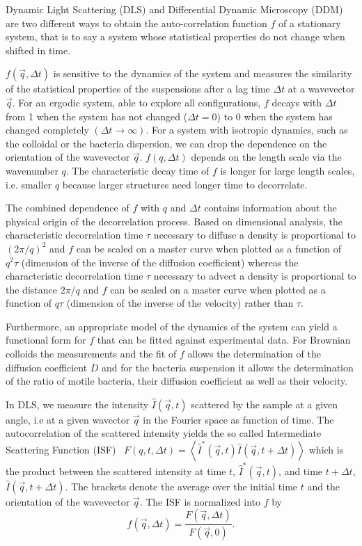 \documentclass[prb,reprint,amsmath,amssymb]{revtex4-1}
\newcommand{\tg}[1]{{\color{magenta}#1}} %
\begin{document}
Dynamic Light Scattering (DLS) and Differential Dynamic Microscopy (DDM) are two different ways to obtain the auto-correlation function \tg{$f$}\cite{ajp1995passmore} of a stationary system, that is to say a system whose statistical properties do not change when shifted in time. \tg{$f(\vec{q}, \Delta t)$ is sensitive to the dynamics of the system and measures the similarity of the statistical properties of the suspensions after a lag time $\Delta t$ at a wavevector $\vec{q}$. For an ergodic system, able to explore all configurations, $f$ decays with $\Delta t$ from 1 when the system has not changed ($\Delta t=0$) to 0 when the system has changed completely $(\Delta t\rightarrow\infty)$. For a system with isotropic dynamics, such as the colloidal or the bacteria dispersion, we can drop the dependence on the orientation of the wavevector $\vec{q}$. $f(q, \Delta t)$ depends on the length scale via the wavenumber $q$. The characteristic decay time of $f$ is longer for large length scales, i.e. smaller $q$ because larger structures need longer time to decorrelate. 

The combined dependence of $f$ with $q$ and $\Delta t$ contains information about the physical origin of the decorrelation process. Based on dimensional analysis, the characteristic decorrelation time $\tau$ necessary to diffuse a density is proportional to $(2\pi/q)^2$ and $f$ can be scaled on a master curve when plotted as a function of $q^2\tau$ (dimension of the inverse of the diffusion coefficient) whereas the characteristic decorrelation time $\tau$ necessary to advect a density is proportional to the distance $2\pi/q$ and $f$ can be scaled on a master curve when plotted as a function of $q\tau$ (dimension of the inverse of the velocity) rather than $\tau$. 

Furthermore, an appropriate model of the dynamics of the system can yield a functional form for $f$ that can be fitted against experimental data. For Brownian colloids the measurements and the fit of $f$ allows the determination of the diffusion coefficient $D$ and for the bacteria suspension it allows the determination of the ratio of motile bacteria, their diffusion coefficient as well as their velocity.}

In DLS, we measure the intensity $\hat{I}(\vec{q}, t)$ scattered by the sample at a given angle, i.e at a given wavector $\vec{q}$ in the Fourier space as function of time. The autocorrelation of the scattered intensity yields the so called Intermediate Scattering Function (ISF)~\cite{19_goodman2005introduction} $F(q, t, \Delta t) = \left\langle \hat{I}^*(\vec{q}, t) \hat{I}(\vec{q}, t+\Delta t) \right\rangle$ \tg{which is the product between the scattered intensity at time $t$,  $\hat{I}^*(\vec{q}, t)$, and time $t+\Delta t$, $\hat{I}(\vec{q}, t+\Delta t)$.} The brackets denote the average over the initial time $t$ and the orientation of the wavevector $\vec{q}$. The ISF is normalized into $f$ by
\begin{equation}
f(\vec{q}, \Delta t) = \frac{F(\vec{q}, \Delta t)}{F(\vec{q}, 0)}.
\end{equation}
\end{document}

